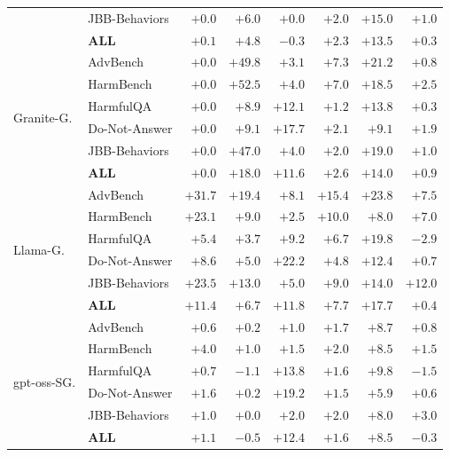 \begin{table}[htbp]
\begin{tabular}{l l r r r r r r}
 & JBB-Behaviors & $+0.0$ & $+6.0$ & $+0.0$ & $+2.0$ & $+15.0$ & $+1.0$ \\
 & \textbf{ALL} & $+0.1$ & $+4.8$ & $-0.3$ & $+2.3$ & $+13.5$ & $+0.3$ \\
\midrule
\multirow{6}{*}{Granite-G.}
 & AdvBench & $+0.0$ & $+49.8$ & $+3.1$ & $+7.3$ & $+21.2$ & $+0.8$ \\
 & HarmBench & $+0.0$ & $+52.5$ & $+4.0$ & $+7.0$ & $+18.5$ & $+2.5$ \\
 & HarmfulQA & $+0.0$ & $+8.9$ & $+12.1$ & $+1.2$ & $+13.8$ & $+0.3$ \\
 & Do-Not-Answer & $+0.0$ & $+9.1$ & $+17.7$ & $+2.1$ & $+9.1$ & $+1.9$ \\
 & JBB-Behaviors & $+0.0$ & $+47.0$ & $+4.0$ & $+2.0$ & $+19.0$ & $+1.0$ \\
 & \textbf{ALL} & $+0.0$ & $+18.0$ & $+11.6$ & $+2.6$ & $+14.0$ & $+0.9$ \\
\midrule
\multirow{6}{*}{Llama-G.}
 & AdvBench & $+31.7$ & $+19.4$ & $+8.1$ & $+15.4$ & $+23.8$ & $+7.5$ \\
 & HarmBench & $+23.1$ & $+9.0$ & $+2.5$ & $+10.0$ & $+8.0$ & $+7.0$ \\
 & HarmfulQA & $+5.4$ & $+3.7$ & $+9.2$ & $+6.7$ & $+19.8$ & $-2.9$ \\
 & Do-Not-Answer & $+8.6$ & $+5.0$ & $+22.2$ & $+4.8$ & $+12.4$ & $+0.7$ \\
 & JBB-Behaviors & $+23.5$ & $+13.0$ & $+5.0$ & $+9.0$ & $+14.0$ & $+12.0$ \\
 & \textbf{ALL} & $+11.4$ & $+6.7$ & $+11.8$ & $+7.7$ & $+17.7$ & $+0.4$ \\
\midrule
\multirow{6}{*}{gpt-oss-SG.}
 & AdvBench & $+0.6$ & $+0.2$ & $+1.0$ & $+1.7$ & $+8.7$ & $+0.8$ \\
 & HarmBench & $+4.0$ & $+1.0$ & $+1.5$ & $+2.0$ & $+8.5$ & $+1.5$ \\
 & HarmfulQA & $+0.7$ & $-1.1$ & $+13.8$ & $+1.6$ & $+9.8$ & $-1.5$ \\
 & Do-Not-Answer & $+1.6$ & $+0.2$ & $+19.2$ & $+1.5$ & $+5.9$ & $+0.6$ \\
 & JBB-Behaviors & $+1.0$ & $+0.0$ & $+2.0$ & $+2.0$ & $+8.0$ & $+3.0$ \\
 & \textbf{ALL} & $+1.1$ & $-0.5$ & $+12.4$ & $+1.6$ & $+8.5$ & $-0.3$ \\
\bottomrule
\end{tabular}

\end{table}
